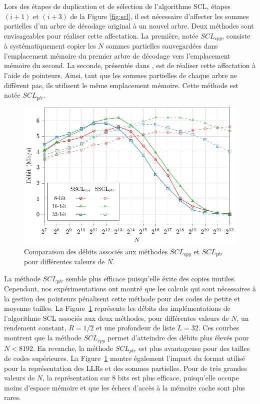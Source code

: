 Lors des étapes de duplication et de sélection de l'algorithme SCL, étapes $(i+1)$ et $(i+3)$ de la Figure \ref{fig:scl}, il est nécessaire d'affecter les sommes partielles d'un arbre de décodage original à un nouvel arbre. Deux méthodes sont envisageables pour réaliser cette affectation. La première, notée $SCL_{cpy}$, consiste à systématiquement copier les $N$ sommes partielles sauvegardées dans l'emplacement mémoire du premier arbre de décodage vers l'emplacement mémoire du second. La seconde, présentée dans \cite{tal_list_2011}, est de réaliser cette affectation à l'aide de pointeurs. Ainsi, tant que les sommes partielles de chaque arbre ne diffèrent pas, ils utilisent le même emplacement mémoire. Cette méthode est notée $SCL_{ptr}$.

\begin{figure}
\centering
\includegraphics{main/ch2_fig/curves/thr/tikz/thr}
\caption{Comparaison des débits associés aux méthodes $SCL_{cpy}$ et $SCL_{ptr}$ pour différentes valeurs de $N$.}
\label{fig:scl_mem}
\end{figure}

La méthode $SCL_{ptr}$ semble plus efficace puisqu'elle évite des copies inutiles. Cependant, nos expérimentations ont montré que les calculs qui sont nécessaires à la gestion des pointeurs pénalisent cette méthode pour des codes de petite et moyenne tailles. La Figure~\ref{fig:scl_mem} représente les débits des implémentations de l'algorithme SCL associés aux deux méthodes, pour différentes valeurs de $N$, un rendement constant, $R=1/2$ et une profondeur de liste $L=32$. Ces courbes montrent que la méthode $SCL_{cpy}$ permet d'atteindre des débits plus élevés pour $N<8192$. En revanche, la méthode $SCL_{ptr}$ est plus avantageuse pour des tailles de codes supérieures. La Figure~\ref{fig:scl_mem} montre également l'impact du format utilisé pour la représentation des LLRs et des sommes partielles. Pour de très grandes valeurs de $N$, la représentation sur 8 bits est plus efficace, puisqu'elle occupe moins d'espace mémoire et que les échecs d'accès à la mémoire cache sont plus rares. 

